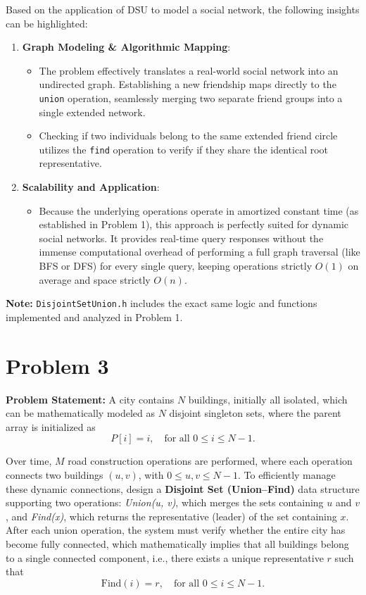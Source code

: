 \documentclass[a4paper,12pt]{article}
\begin{document}
Based on the application of DSU to model a social network, the following insights can be highlighted:

\begin{enumerate}
    \item \textbf{Graph Modeling \& Algorithmic Mapping}:
    \begin{itemize}
        \item The problem effectively translates a real-world social network into an undirected graph. Establishing a new friendship maps directly to the \texttt{union} operation, seamlessly merging two separate friend groups into a single extended network.
        \item Checking if two individuals belong to the same extended friend circle utilizes the \texttt{find} operation to verify if they share the identical root representative.
    \end{itemize}

    \item \textbf{Scalability and Application}:
    \begin{itemize}
        \item Because the underlying operations operate in amortized constant time (as established in Problem 1), this approach is perfectly suited for dynamic social networks. It provides real-time query responses without the immense computational overhead of performing a full graph traversal (like BFS or DFS) for every single query, keeping operations strictly $O(1)$ on average and space strictly $O(n)$.
    \end{itemize}
\end{enumerate}

\vspace{0.5em}
\noindent \textbf{Note:} \texttt{DisjointSetUnion.h} includes the exact same logic and functions implemented and analyzed in Problem 1.

\newpage


\section*{Problem 3}
\textbf{Problem Statement:} A city contains $N$ buildings, initially all isolated, which can be mathematically modeled as $N$ disjoint singleton sets, where the parent array is initialized as
$$P[i] = i, \quad \text{for all } 0 \le i \le N - 1.$$

Over time, $M$ road construction operations are performed, where each operation connects two buildings $(u, v)$, with $0 \le u, v \le N - 1$. To efficiently manage these dynamic connections, design a \textbf{Disjoint Set (Union--Find)} data structure supporting two operations: \textit{Union(u, v)}, which merges the sets containing $u$ and $v$, and \textit{Find(x)}, which returns the representative (leader) of the set containing $x$. After each union operation, the system must verify whether the entire city has become fully connected, which mathematically implies that all buildings belong to a single connected component, i.e., there exists a unique representative $r$ such that
$$\text{Find}(i) = r, \quad \text{for all } 0 \le i \le N - 1.$$
\end{document}
